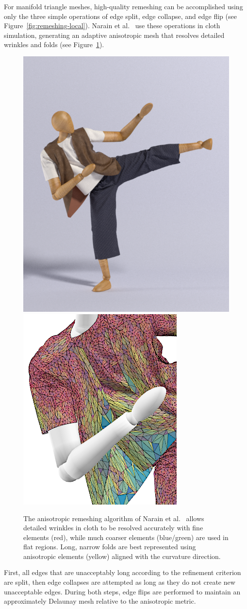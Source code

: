 For manifold triangle meshes, high-quality remeshing can be accomplished using only the three simple operations of edge split, edge collapse, and edge flip (see Figure~\ref{fig:remeshing-local}).
Narain et al.~\cite{Narain2012} use these operations in cloth simulation, generating an adaptive anisotropic mesh that resolves detailed wrinkles and folds (see Figure~\ref{fig:Narain2012}).
\begin{figure}[!t]
	\centering
	\includegraphics[width=0.35\linewidth]{images/starAdaptivity-cgf2016/cloth-render.png}
	\includegraphics[width=0.35\linewidth]{images/starAdaptivity-cgf2016/cloth-wire-zoom.png}
	\caption[STAR adaptivity: Anisotropic remeshing of triangular meshes]{The anisotropic remeshing algorithm of Narain et al.~\cite{Narain2012} allows detailed wrinkles in cloth to be resolved accurately with fine elements (red), while much coarser elements (blue/green) are used in flat regions. Long, narrow folds are best represented using anisotropic elements (yellow) aligned with the curvature direction.}
	\label{fig:Narain2012}
\end{figure}
First, all edges that are unacceptably long according to the refinement criterion are split, then edge collapses are attempted as long as they do not create new unacceptable edges.
During both steps, edge flips are performed to maintain an approximately Delaunay mesh relative to the anisotropic metric.


